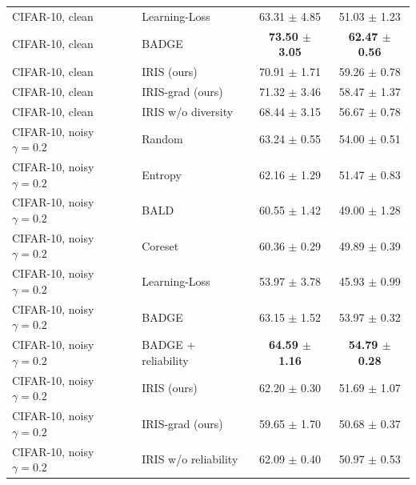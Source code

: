 \begin{tabular}{llcc}
CIFAR-10, clean & Learning-Loss & 63.31 $\pm$ 4.85 & 51.03 $\pm$ 1.23 \\
CIFAR-10, clean & BADGE & \textbf{73.50 $\pm$ 3.05} & \textbf{62.47 $\pm$ 0.56} \\
CIFAR-10, clean & IRIS (ours) & 70.91 $\pm$ 1.71 & 59.26 $\pm$ 0.78 \\
CIFAR-10, clean & IRIS-grad (ours) & 71.32 $\pm$ 3.46 & 58.47 $\pm$ 1.37 \\
CIFAR-10, clean & IRIS w/o  diversity & 68.44 $\pm$ 3.15 & 56.67 $\pm$ 0.78 \\
\midrule
CIFAR-10, noisy $\gamma{=}0.2$ & Random & 63.24 $\pm$ 0.55 & 54.00 $\pm$ 0.51 \\
CIFAR-10, noisy $\gamma{=}0.2$ & Entropy & 62.16 $\pm$ 1.29 & 51.47 $\pm$ 0.83 \\
CIFAR-10, noisy $\gamma{=}0.2$ & BALD & 60.55 $\pm$ 1.42 & 49.00 $\pm$ 1.28 \\
CIFAR-10, noisy $\gamma{=}0.2$ & Coreset & 60.36 $\pm$ 0.29 & 49.89 $\pm$ 0.39 \\
CIFAR-10, noisy $\gamma{=}0.2$ & Learning-Loss & 53.97 $\pm$ 3.78 & 45.93 $\pm$ 0.99 \\
CIFAR-10, noisy $\gamma{=}0.2$ & BADGE & 63.15 $\pm$ 1.52 & 53.97 $\pm$ 0.32 \\
CIFAR-10, noisy $\gamma{=}0.2$ & BADGE + reliability & \textbf{64.59 $\pm$ 1.16} & \textbf{54.79 $\pm$ 0.28} \\
CIFAR-10, noisy $\gamma{=}0.2$ & IRIS (ours) & 62.20 $\pm$ 0.30 & 51.69 $\pm$ 1.07 \\
CIFAR-10, noisy $\gamma{=}0.2$ & IRIS-grad (ours) & 59.65 $\pm$ 1.70 & 50.68 $\pm$ 0.37 \\
CIFAR-10, noisy $\gamma{=}0.2$ & IRIS w/o  reliability & 62.09 $\pm$ 0.40 & 50.97 $\pm$ 0.53 \\
\bottomrule
\end{tabular}
